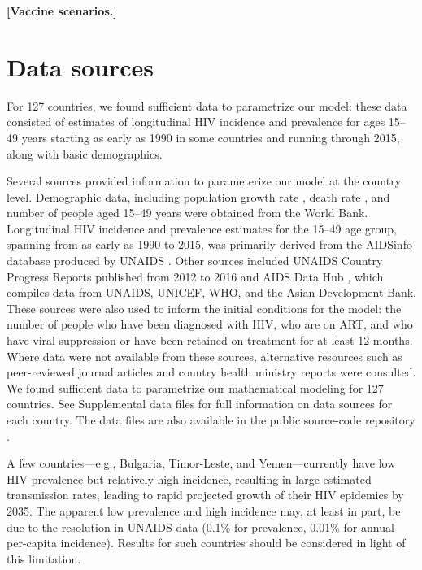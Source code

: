 \documentclass{article}
\newcommand{\comment}[1]{\textbf{[#1]}}
\begin{document}
\comment{Vaccine scenarios.}


\section{Data sources}
\label{data_sources}

For 127 countries, we found sufficient data to parametrize our model:
these data consisted of estimates of longitudinal HIV incidence and
prevalence for ages 15–49 years starting as early as 1990 in some
countries and running through 2015, along with basic demographics.

Several sources provided information to parameterize our model at the
country level. Demographic data, including population growth rate
\cite{WorldBankpg}, death rate
\cite{World_Development_Indicators2013-ee}, and number of people aged
15--49 years \cite{The_World_Bank2016-fd} were obtained from the World
Bank. Longitudinal HIV incidence and prevalence estimates for the
15--49 age group, spanning from as early as 1990 to 2015, was
primarily derived from the AIDSinfo database produced by UNAIDS
\cite{Unaids2016-an}. Other sources included UNAIDS Country Progress
Reports \cite{Unaids2016-am} published from 2012 to 2016 and AIDS Data
Hub \cite{AIDSdatahub-fg}, which compiles data from UNAIDS, UNICEF,
WHO, and the Asian Development Bank. These sources were also used to
inform the initial conditions for the model: the number of people who
have been diagnosed with HIV, who are on ART, and who have viral
suppression or have been retained on treatment for at least 12
months. Where data were not available from these sources, alternative
resources such as peer-reviewed journal articles and country health
ministry reports were consulted.  We found sufficient data to
parametrize our mathematical modeling for 127 countries.  See
Supplemental data files for full information on data sources for each
country.  The data files are also available in the public source-code
repository \cite{medlock2016-git}.

A few countries—e.g., Bulgaria, Timor-Leste, and Yemen—currently have
low HIV prevalence but relatively high incidence, resulting in large
estimated transmission rates, leading to rapid projected growth of
their HIV epidemics by 2035. The apparent low prevalence and high
incidence may, at least in part, be due to the resolution in UNAIDS
data (0.1\% for prevalence, 0.01\% for annual per-capita incidence).
Results for such countries should be considered in light of this
limitation.
\end{document}
